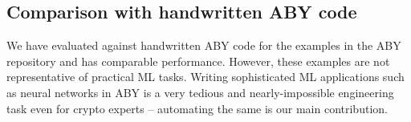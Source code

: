 \subsection{Comparison with handwritten ABY code}

We have evaluated against handwritten ABY code for the examples in the
ABY repository and \tool has comparable performance. However, these
examples are not representative of practical ML tasks. Writing
sophisticated ML applications such as neural networks in ABY is a very
tedious and nearly-impossible engineering task even for crypto experts
-- automating the same is our main contribution.


